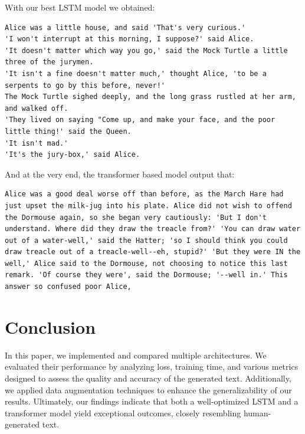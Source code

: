 \documentclass{article}
\begin{document}
With our best LSTM model we obtained: 
\begin{lstlisting}[breaklines]
Alice was a little house, and said 'That's very curious.'
'I won't interrupt at this morning, I suppose?' said Alice.
'It doesn't matter which way you go,' said the Mock Turtle a little three of the jurymen.
'It isn't a fine doesn't matter much,' thought Alice, 'to be a serpents to go by this before, never!'
The Mock Turtle sighed deeply, and the long grass rustled at her arm, and walked off.
'They lived on saying "Come up, and make your face, and the poor little thing!' said the Queen.
'It isn't mad.'
'It's the jury-box,' said Alice.
\end{lstlisting}

And at the very end, the transformer based model output that:
\begin{lstlisting}[breaklines]
Alice was a good deal worse off than before, as the March Hare had just upset the milk-jug into his plate. Alice did not wish to offend the Dormouse again, so she began very cautiously: 'But I don't understand. Where did they draw the treacle from?' 'You can draw water out of a water-well,' said the Hatter; 'so I should think you could draw treacle out of a treacle-well--eh, stupid?' 'But they were IN the well,' Alice said to the Dormouse, not choosing to notice this last remark. 'Of course they were', said the Dormouse; '--well in.' This answer so confused poor Alice,
\end{lstlisting}

\section{Conclusion}

In this paper, we implemented and compared multiple architectures. We evaluated their performance by analyzing loss, training time, and various metrics designed to assess the quality and accuracy of the generated text. Additionally, we applied data augmentation techniques to enhance the generalizability of our results. Ultimately, our findings indicate that both a well-optimized LSTM and a transformer model yield exceptional outcomes, closely resembling human-generated text.


\newpage



\newpage
\end{document}
